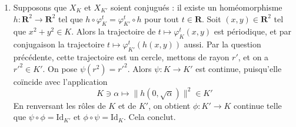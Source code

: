 \documentclass[a4paper,12pt,openany]{article}
\theoremstyle{plain}
\theoremstyle{definition}
\newcommand{\R}{\mathbf{R}}
\newcommand{\Id}{\mathrm{Id}}
\begin{document}
\begin{enumerate}
\item Supposons que $X_K$ et $X_{K'}$ soient conjugu\'es : il existe un hom\'eomorphisme $h : \R^2 \to \R^2$ tel que $h \circ \varphi_K^t = \varphi_{K'}^{t} \circ h$ pour tout $t \in \R.$ Soit $(x,y) \in \R^2$ tel que $x^2 + y^2 \in K$. Alors la trajectoire de $t \mapsto \varphi_K^t(x,y)$ est p\'eriodique, et par conjugaison la trajectoire $t \mapsto \varphi_{K'}^t(h(x,y))$ aussi. Par la question pr\'ec\'edente, cette trajectoire est un cercle, mettons de rayon $r'$, et on a $r'^2 \in K'$. On pose $\psi(r^2) = r'^2.$ Alors $\psi : K \to K'$ est continue, puisqu'elle co\"incide avec l'application
$$
K \ni \alpha \mapsto \|h(0, \sqrt{\alpha})\|^2 \in K'
$$
En renversant les r\^oles de $K$ et de $K'$, on obtient $\phi : K' \to K$ continue telle que $\psi \circ \phi =  \Id_{K'}$ et $\phi \circ \psi = \Id_K$. Cela conclut.

\end{enumerate}
\end{document}
